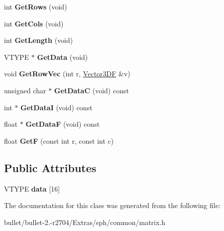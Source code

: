 \begin{DoxyCompactItemize}
\item 
\hypertarget{class_matrix4_f_ae04882ed70a4486912ee9c6501f9ad9b}{int {\bfseries Get\+Rows} (void)}\label{class_matrix4_f_ae04882ed70a4486912ee9c6501f9ad9b}

\item 
\hypertarget{class_matrix4_f_abd7f65d69dc3b90095d73f9ed0d595a1}{int {\bfseries Get\+Cols} (void)}\label{class_matrix4_f_abd7f65d69dc3b90095d73f9ed0d595a1}

\item 
\hypertarget{class_matrix4_f_ad2925b921292d2e1039d23a659d335b3}{int {\bfseries Get\+Length} (void)}\label{class_matrix4_f_ad2925b921292d2e1039d23a659d335b3}

\item 
\hypertarget{class_matrix4_f_a71cbe57f6d53aab08e507d670d720570}{V\+T\+Y\+P\+E $\ast$ {\bfseries Get\+Data} (void)}\label{class_matrix4_f_a71cbe57f6d53aab08e507d670d720570}

\item 
\hypertarget{class_matrix4_f_ab78ed1e211d7d765ab607e109d4b14ac}{void {\bfseries Get\+Row\+Vec} (int r, \hyperlink{class_vector3_d_f}{Vector3\+D\+F} \&v)}\label{class_matrix4_f_ab78ed1e211d7d765ab607e109d4b14ac}

\item 
\hypertarget{class_matrix4_f_a8a8797829b1da8abca1321ca5951da80}{unsigned char $\ast$ {\bfseries Get\+Data\+C} (void) const }\label{class_matrix4_f_a8a8797829b1da8abca1321ca5951da80}

\item 
\hypertarget{class_matrix4_f_aaf36a647361e57c86dd7422725071231}{int $\ast$ {\bfseries Get\+Data\+I} (void) const }\label{class_matrix4_f_aaf36a647361e57c86dd7422725071231}

\item 
\hypertarget{class_matrix4_f_a839d35d9e9515261101f886ba7dc5f68}{float $\ast$ {\bfseries Get\+Data\+F} (void) const }\label{class_matrix4_f_a839d35d9e9515261101f886ba7dc5f68}

\item 
\hypertarget{class_matrix4_f_a9057ca63d826f01f33ebd007963ef00f}{float {\bfseries Get\+F} (const int r, const int c)}\label{class_matrix4_f_a9057ca63d826f01f33ebd007963ef00f}

\end{DoxyCompactItemize}
\subsection*{Public Attributes}
\begin{DoxyCompactItemize}
\item 
\hypertarget{class_matrix4_f_a7a9982f9a89cced0f462a66cafd919fb}{V\+T\+Y\+P\+E {\bfseries data} \mbox{[}16\mbox{]}}\label{class_matrix4_f_a7a9982f9a89cced0f462a66cafd919fb}

\end{DoxyCompactItemize}


The documentation for this class was generated from the following file\+:\begin{DoxyCompactItemize}
\item 
bullet/bullet-\/2.-\/r2704/\+Extras/sph/common/matrix.\+h\end{DoxyCompactItemize}
